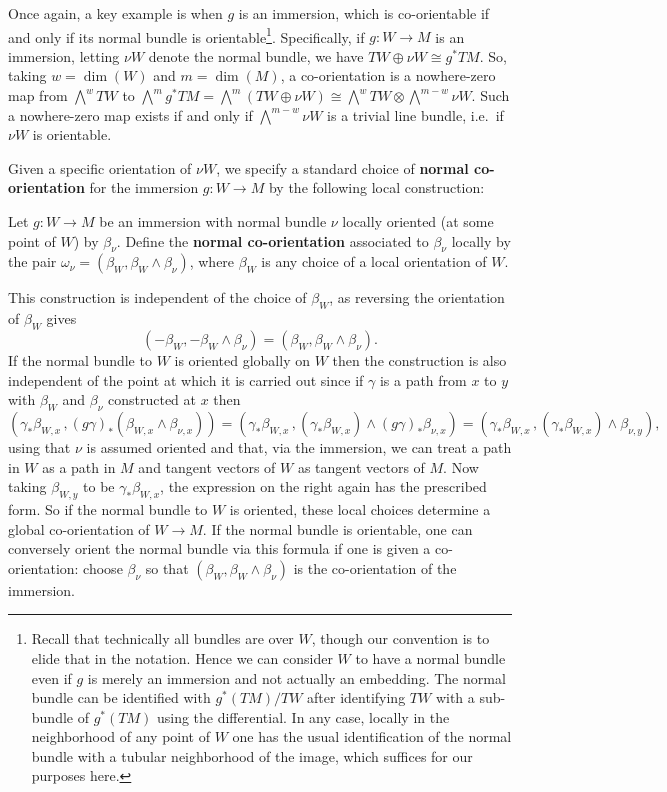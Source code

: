 Once again, a key example is when $g$ is an immersion, which is co-orientable if and only if its normal bundle is orientable\footnote{Recall that technically all bundles are over $W$, though our convention is to elide that in the notation.
	Hence we can consider $W$ to have a normal bundle even if $g$ is merely an immersion and not actually an embedding.
	The normal bundle can be identified with $g^*(TM)/TW$ after identifying $TW$ with a sub-bundle of $g^*(TM)$ using the differential.
	In any case, locally in the neighborhood of any point of $W$ one has the usual identification of the normal bundle with a tubular neighborhood of the image, which suffices for our purposes here.}.
Specifically, if $g \colon W \to M$ is an immersion, letting $\nu W$ denote the normal bundle, we have $TW \oplus \nu W \cong g^*TM$.
So, taking $w = \dim(W)$ and $m = \dim(M)$, a co-orientation is a nowhere-zero map from $\bigwedge^w TW$ to $\bigwedge^m g^*TM = \bigwedge^m (TW \oplus \nu W) \cong \bigwedge^w TW \otimes \bigwedge^{m-w}\nu W$.
Such a nowhere-zero map exists if and only if $\bigwedge^{m-w}\nu W$ is a trivial line bundle, i.e.\ if $\nu W$ is orientable.

Given a specific orientation of $\nu W$, we specify a standard choice of \textbf{normal co-orientation} for the immersion $g \colon W \to M$ by the following local construction:

\begin{definition}\label{normal co-or}
	Let $g \colon W \to M$ be an immersion with normal bundle $\nu$ locally oriented (at some point of $W$) by $\beta_\nu$.
	Define the \textbf{normal co-orientation} associated to $\beta_\nu$ locally by the pair $\omega_{\nu} = (\beta_W, \beta_W \wedge \beta_\nu)$, where $\beta_W$ is any choice of a local orientation of $W$.
\end{definition}

This construction is independent of the choice of $\beta_W$, as reversing the orientation of $\beta_W$ gives
$$(-\beta_W, -\beta_W \wedge \beta_\nu) = (\beta_W, \beta_W \wedge \beta_\nu).$$
If the normal bundle to $W$ is oriented globally on $W$ then the construction is also independent of the point at which it is carried out since if $\gamma$ is a path from $x$ to $y$ with $\beta_W$ and $\beta_\nu$ constructed at $x$ then
\begin{equation*}
	(\gamma_*\beta_{W,x}\, , (g\gamma)_* (\beta_{W,x} \wedge \beta_{\nu,x})) =
	(\gamma_*\beta_{W,x}\, , (\gamma_* \beta_{W,x}) \wedge (g\gamma)_*\beta_{\nu,x}) =
	(\gamma_*\beta_{W,x}\, , (\gamma_* \beta_{W,x}) \wedge \beta_{\nu,y}),
\end{equation*}
using that $\nu$ is assumed oriented and that, via the immersion, we can treat a path in $W$ as a path in $M$ and tangent vectors of $W$ as tangent vectors of $M$.
Now taking $\beta_{W,y}$ to be $\gamma_* \beta_{W,x}$, the expression on the right again has the prescribed form.
So if the normal bundle to $W$ is oriented, these local choices determine a global co-orientation of $W \to M$.
If the normal bundle is orientable, one can conversely orient the normal bundle via this formula if one is given a co-orientation: choose $\beta_\nu$ so that $(\beta_W, \beta_W \wedge \beta_\nu)$ is the co-orientation of the immersion.

